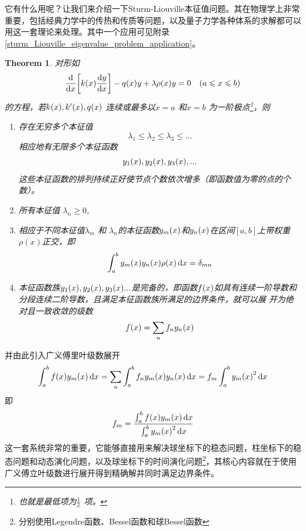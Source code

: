 \documentclass[12pt,a4paper,openany,twoside]{book}
\newtheorem{theorem}{Theorem}[section]
\numberwithin{equation}{section}
\begin{document}
          它有什么用呢？让我们来介绍一下Sturm-Liouville本征值问题。其在物理学上非常重要，包括经典力学中的传热和传质等问题，以及量子力学各种体系的求解都可以用这一套理论来处理。其中一个应用可见附录\ref{sturm_Liouville_eigenvalue_problem_application}。
          \begin{theorem}
            对形如
            \begin{equation}
              \dv{x}\qty[k\qty(x)\dv{y}{x}]-q\qty(x)y +\lambda\rho\qty(x)y=0 \quad (a\leqslant x \leqslant b)
            \end{equation}
            的方程，若$k\qty(x),k'\qty(x),q\qty(x)$ 连续或最多以$x=a$ 和$x=b$ 为一阶极点\footnote{也就是最低项为$\frac{1}{x}$ 项。}，则
            \begin{enumerate}
              \item 存在无穷多个本征值
                \begin{equation*}
                  \lambda_1 \leqslant \lambda_2 \leqslant \lambda_3 \leqslant ...
                \end{equation*} 
                相应地有无限多个本征函数
                \begin{equation*}
                  y_1\qty(x),y_2\qty(x),y_3\qty(x),...
                \end{equation*}
                这些本征函数的排列持续正好使节点个数依次增多（即函数值为零的点的个数）。
              \item 所有本征值 $\lambda_n \geqslant 0$,
              \item 相应于不同本征值$\lambda_m$ 和 $\lambda_n$的本征函数$y_m\qty(x)$和$y_n\qty(x)$在区间$[a,b]$上带权重$\rho(x)$正交，即
                \begin{equation}
                  \int^b_a{y_m\qty(x)y_n\qty(x)\rho\qty(x)\dd{x}}=\delta_{mn} 
                \end{equation}
              \item 本征函数族$y_1\qty(x),y_2\qty(x),y_3\qty(x)...$是完备的，即函数$f\qty(x)$如具有连续一阶导数和分段连续二阶导数，且满足本征函数族所满足的边界条件，就可以展   开为绝对且一致收敛的级数
                \begin{equation*}
                  f\qty(x) = \sum_n{f_n y_n\qty(x)}
                \end{equation*}
            \end{enumerate}
          \end{theorem}
          并由此引入广义傅里叶级数展开
          \begin{equation*}
            \int^b_a{f\qty(x)y_m\qty(x)\dd{x}} =\sum_n{\int^b_a{f_n y_m\qty(x)y_n\qty(x)\dd{x}}}= f_m\int^b_a{y_m\qty(x)^2\dd{x}} 
          \end{equation*} 
          即
          \begin{equation*}
            f_m=\frac{\int^b_a{f\qty(x)y_m\qty(x)\dd{x}}}{\int^b_a{y_m\qty(x)^2\dd{x}}}
          \end{equation*} 
          这一套系统非常的重要，它能够直接用来解决球坐标下的稳态问题，柱坐标下的稳态问题和动态演化问题，以及球坐标下的时间演化问题\footnote{分别使用Legendre函数、Bessel函数和球Bessel函数}，其核心内容就在于使用广义傅立叶级数进行展开得到精确解并同时满足边界条件。
\end{document}
